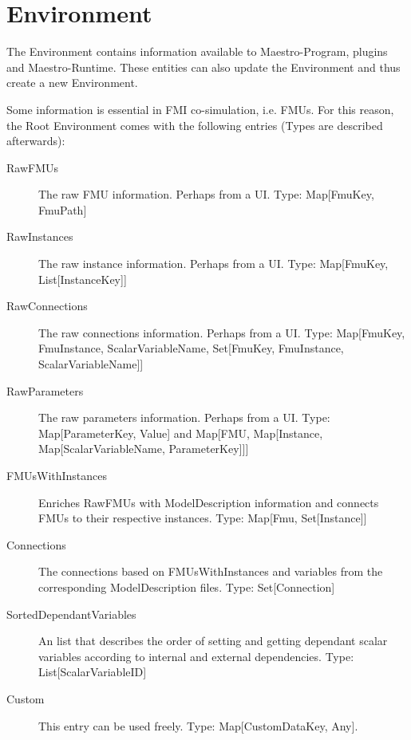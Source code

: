 \section{Environment}
The Environment contains information available to Maestro-Program,
plugins and Maestro-Runtime. These entities can also update the Environment and
thus create a new Environment.

Some information is essential in FMI co-simulation, i.e. FMUs.
For this reason, the Root Environment comes with the following entries (Types
are described afterwards):
\begin{description}
  \item[RawFMUs] The raw FMU information. Perhaps from a UI. Type: Map[FmuKey, FmuPath]
  \item[RawInstances] The raw instance information. Perhaps from a UI. Type: Map[FmuKey, List[InstanceKey]]
  \item[RawConnections] The raw connections information. Perhaps from a UI.
    Type: Map[{FmuKey, FmuInstance, ScalarVariableName}, Set[{FmuKey, FmuInstance, ScalarVariableName}]]
  \item[RawParameters] The raw parameters information. Perhaps from a UI.
    Type: Map[ParameterKey, Value] and Map[FMU, Map[Instance, Map[ScalarVariableName, ParameterKey]]]
  \item[FMUsWithInstances] Enriches RawFMUs with ModelDescription information
    and connects FMUs to their respective instances. Type: Map[Fmu, Set[Instance]]
  \item[Connections] The connections based on FMUsWithInstances and variables
    from the corresponding ModelDescription files. Type: Set[Connection]
  \item[SortedDependantVariables] An list that describes the order of setting
    and getting dependant scalar variables according to internal and external
    dependencies. Type: List[ScalarVariableID]
    \item[Custom] This entry can be used freely. Type: Map[CustomDataKey, Any].
\end{description}

